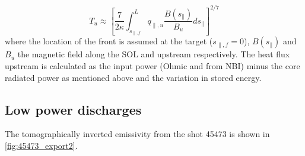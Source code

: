 \begin{equation}
T_u \approx \left [ \frac{7}{2 \kappa} \int_{s_{\parallel,f}}^{L} q_{\parallel,u} \frac{B(s_{\parallel})}{B_u} ds_{\parallel} \right ]^{2/7}
\label{eq:thomo1}
\end{equation}
where the location of the front is assumed at the target ($s_{\parallel,f}=0$), $B(s_{\parallel})$ and ${B_u}$ the magnetic field along the SOL and upstream respectively. The heat flux upstream is calculated as the input power (Ohmic and from NBI) minus the core radiated power as mentioned above and the variation in stored energy.

\subsection{Low power discharges}

The tomographically inverted emissivity from the shot 45473 is shown in \autoref{fig:45473_export2}.

